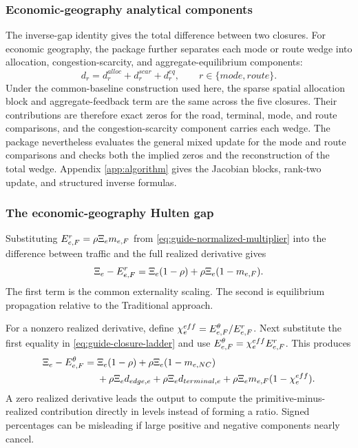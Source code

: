 \subsubsection{Economic-geography analytical components}

The inverse-gap identity gives the total difference between two closures. For
economic geography, the package further separates each mode or route wedge
into allocation, congestion-scarcity, and aggregate-equilibrium components:
\[
 d_r=d_r^{alloc}+d_r^{scar}+d_r^{eq},
 \qquad r\in\{mode,route\}.
\]
Under the common-baseline construction used here, the sparse spatial
allocation block and aggregate-feedback term are the same across the five
closures.
Their contributions are therefore exact zeros for the road, terminal, mode,
and route comparisons, and the congestion-scarcity component carries each
wedge. The package nevertheless evaluates the general mixed update for the
mode and route comparisons and checks both the implied zeros and the
reconstruction of the total wedge. Appendix \ref{app:algorithm} gives the
Jacobian blocks, rank-two update, and structured inverse formulas.

\subsubsection{The economic-geography Hulten gap}

Substituting
\(E^{r}_{e,F}=\rho\Xi_e m_{e,F}\) from
\eqref{eq:guide-normalized-multiplier} into the difference between traffic and
the full realized derivative gives
\[
 \Xi_e-E^{r}_{e,F}
 =\Xi_e(1-\rho)+\rho\Xi_e(1-m_{e,F}).
\]
The first term is the common externality scaling. The second is equilibrium
propagation relative to the Traditional approach.

For a nonzero realized derivative, define
\(\chi_e^{eff}=E^{\theta}_{e,F}/E^{r}_{e,F}\). Next substitute the first equality in
\eqref{eq:guide-closure-ladder} and use
\(E^{\theta}_{e,F}=\chi_e^{eff}E^{r}_{e,F}\). This produces
\begin{align*}
 \Xi_e-E^{\theta}_{e,F}
 ={}&\Xi_e(1-\rho)
 +\rho\Xi_e(1-m_{e,NC})\\
 &+\rho\Xi_e d_{edge,e}
 +\rho\Xi_e d_{terminal,e}
 +\rho\Xi_e m_{e,F}(1-\chi_e^{eff}).
\end{align*}
A zero realized derivative leads the output to compute the
primitive-minus-realized contribution directly in levels instead of forming a
ratio. Signed percentages can be misleading if large positive and negative
components nearly cancel.

